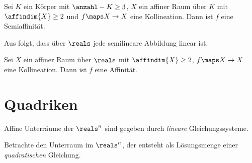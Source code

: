 Sei \( K \) ein Körper mit \( \anzahl-{K}\geq 3 \), \( X \) ein affiner Raum über \( K \) mit \( \affindim{X}\geq 2 \) und \( f\maps X\to X \) eine Kollineation. Dann ist \( f \) eine Semiaffinität.

\begin{bemerkung*}
    Aus  folgt, dass über \( \reals \) jede semilineare Abbildung linear ist.
\end{bemerkung*}
\begin{korollar*}
    Sei \( X \) ein affiner Raum über \( \reals \) mit \( \affindim{X}\geq 2 \), \( f\maps X\to X \) eine Kollineation. Dann ist \( f \) eine Affinität.
\end{korollar*}

\section{Quadriken}
\begin{motivation*}
    Affine Unterräume der \( \reals^n \) sind gegeben durch \emph{lineare} Gleichungssysteme.
\end{motivation*}
Betrachte den Unterraum im \( \reals^n \), der entsteht als Lösungsmenge einer \emph{quadratischen} Gleichung.
